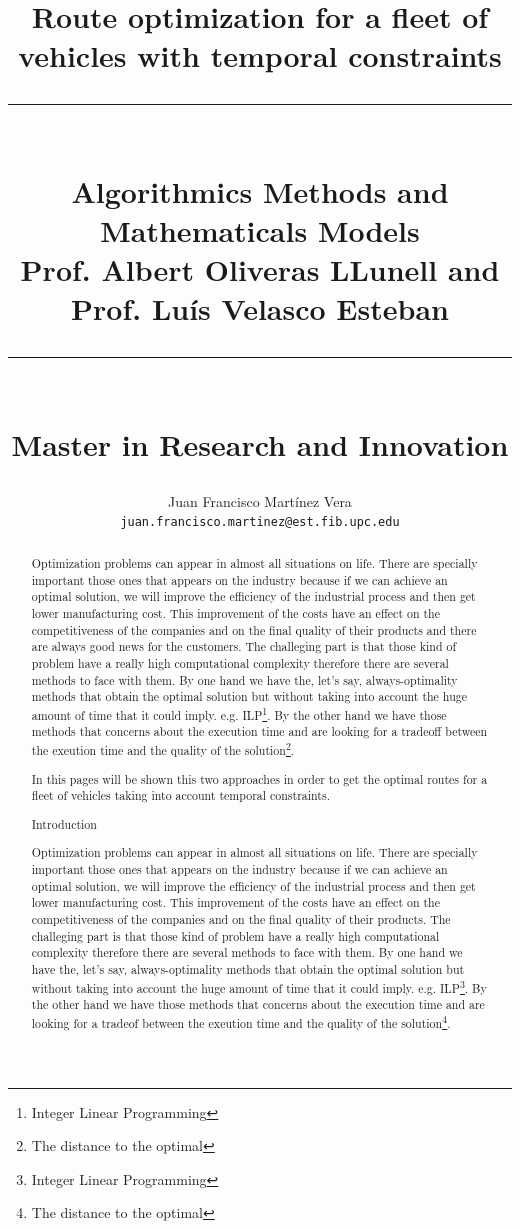 \documentclass[]{report}
\title{{\Huge Route optimization for a fleet of vehicles with temporal constraints} \\
\noindent\rule{4cm}{0.4pt}\\
Algorithmics Methods and Mathematicals Models \\
Prof. Albert Oliveras LLunell and Prof. Lu\'is Velasco Esteban\\
\noindent\rule{4cm}{0.4pt}\\
Master in Research and Innovation}
\author{Juan Francisco Mart\'inez Vera \\
{\tt juan.francisco.martinez@est.fib.upc.edu}}
\begin{document}
\maketitle

\newcommand{\localtextbulletone}{\textcolor{gray}{\raisebox{.50ex}{\rule{.6ex}{.6ex}}}}
\renewcommand{\labelitemi}{\localtextbulletone}

\begin{abstract}
	Optimization problems can appear in almost all situations on life. There are specially important those ones that appears on the industry because if we can achieve an optimal solution, we will improve the efficiency of the industrial process and then get lower manufacturing cost. This improvement of the costs have an effect on the competitiveness of the companies and on the final quality of their products and there are always good news for the customers. The challeging part is that those kind of problem have a really high computational complexity therefore there are several methods to face with them. By one hand we have the, let's say, always-optimality methods that obtain the optimal solution but without taking into account the huge amount of time that it could imply. e.g. ILP\footnote{Integer Linear Programming}. By the other hand we have those methods that concerns about the execution time and are looking for a tradeoff between the exeution time and the quality of the solution\footnote{The distance to the optimal}.
	
	In this pages will be shown this two approaches in order to get the optimal routes for a fleet of vehicles taking into account temporal constraints.
	
\tableofcontents
	
\chapter{Introduction}
	Optimization problems can appear in almost all situations on life. There are specially important those ones that appears on the industry because if we can achieve an optimal solution, we will improve the efficiency of the industrial process and then get lower manufacturing cost. This improvement of the costs have an effect on the competitiveness of the companies and on the final quality of their products. The challeging part is that those kind of problem have a really high computational complexity therefore there are several methods to face with them. By one hand we have the, let's say, always-optimality methods that obtain the optimal solution but without taking into account the huge amount of time that it could imply. e.g. ILP\footnote{Integer Linear Programming}. By the other hand we have those methods that concerns about the execution time and are looking for a tradeof between the exeution time and the quality of the solution\footnote{The distance to the optimal}.
	

\end{abstract}
\end{document}

